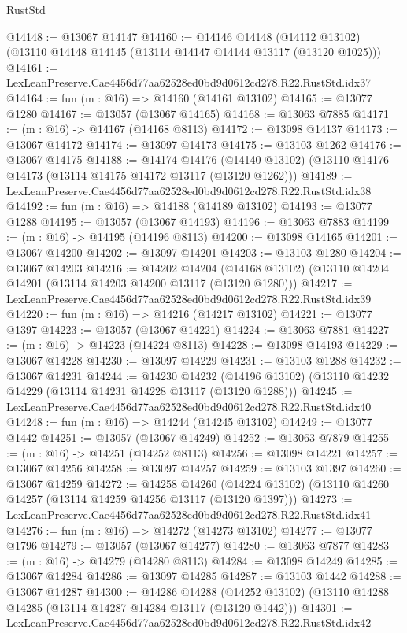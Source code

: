 \begin{lexlean}{RustStd}
\begin{coremodule}
@14148 := @13067 @14147
@14160 := @14146
    @14148
    (@14112 @13102)
    (@13110 @14148 @14145 (@13114 @14147 @14144 @13117 (@13120 @1025)))
@14161 := LexLeanPreserve.Cae4456d77aa62528ed0bd9d0612cd278.R22.RustStd.idx37
@14164 := fun (m : @16) => @14160 (@14161 @13102)
@14165 := @13077 @1280
@14167 := @13057 (@13067 @14165)
@14168 := @13063 @7885
@14171 := (m : @16) -> @14167 (@14168 @8113)
@14172 := @13098 @14137
@14173 := @13067 @14172
@14174 := @13097 @14173
@14175 := @13103 @1262
@14176 := @13067 @14175
@14188 := @14174
    @14176
    (@14140 @13102)
    (@13110 @14176 @14173 (@13114 @14175 @14172 @13117 (@13120 @1262)))
@14189 := LexLeanPreserve.Cae4456d77aa62528ed0bd9d0612cd278.R22.RustStd.idx38
@14192 := fun (m : @16) => @14188 (@14189 @13102)
@14193 := @13077 @1288
@14195 := @13057 (@13067 @14193)
@14196 := @13063 @7883
@14199 := (m : @16) -> @14195 (@14196 @8113)
@14200 := @13098 @14165
@14201 := @13067 @14200
@14202 := @13097 @14201
@14203 := @13103 @1280
@14204 := @13067 @14203
@14216 := @14202
    @14204
    (@14168 @13102)
    (@13110 @14204 @14201 (@13114 @14203 @14200 @13117 (@13120 @1280)))
@14217 := LexLeanPreserve.Cae4456d77aa62528ed0bd9d0612cd278.R22.RustStd.idx39
@14220 := fun (m : @16) => @14216 (@14217 @13102)
@14221 := @13077 @1397
@14223 := @13057 (@13067 @14221)
@14224 := @13063 @7881
@14227 := (m : @16) -> @14223 (@14224 @8113)
@14228 := @13098 @14193
@14229 := @13067 @14228
@14230 := @13097 @14229
@14231 := @13103 @1288
@14232 := @13067 @14231
@14244 := @14230
    @14232
    (@14196 @13102)
    (@13110 @14232 @14229 (@13114 @14231 @14228 @13117 (@13120 @1288)))
@14245 := LexLeanPreserve.Cae4456d77aa62528ed0bd9d0612cd278.R22.RustStd.idx40
@14248 := fun (m : @16) => @14244 (@14245 @13102)
@14249 := @13077 @1442
@14251 := @13057 (@13067 @14249)
@14252 := @13063 @7879
@14255 := (m : @16) -> @14251 (@14252 @8113)
@14256 := @13098 @14221
@14257 := @13067 @14256
@14258 := @13097 @14257
@14259 := @13103 @1397
@14260 := @13067 @14259
@14272 := @14258
    @14260
    (@14224 @13102)
    (@13110 @14260 @14257 (@13114 @14259 @14256 @13117 (@13120 @1397)))
@14273 := LexLeanPreserve.Cae4456d77aa62528ed0bd9d0612cd278.R22.RustStd.idx41
@14276 := fun (m : @16) => @14272 (@14273 @13102)
@14277 := @13077 @1796
@14279 := @13057 (@13067 @14277)
@14280 := @13063 @7877
@14283 := (m : @16) -> @14279 (@14280 @8113)
@14284 := @13098 @14249
@14285 := @13067 @14284
@14286 := @13097 @14285
@14287 := @13103 @1442
@14288 := @13067 @14287
@14300 := @14286
    @14288
    (@14252 @13102)
    (@13110 @14288 @14285 (@13114 @14287 @14284 @13117 (@13120 @1442)))
@14301 := LexLeanPreserve.Cae4456d77aa62528ed0bd9d0612cd278.R22.RustStd.idx42

\end{coremodule}
\end{lexlean}
